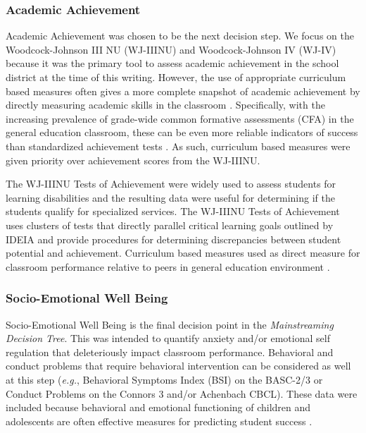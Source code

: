 \documentclass[twoside]{article}
\begin{document}
\subsubsection{Academic Achievement}
Academic Achievement was chosen to be the next decision step. We focus on the Woodcock-Johnson III NU (WJ-IIINU) and Woodcock-Johnson IV (WJ-IV) because it was the primary tool to assess academic achievement in the school district at the time of this writing. However, the use of appropriate curriculum based measures often gives a more complete snapshot of academic achievement by directly measuring academic skills in the classroom \parencite{mathes1998preparing}. Specifically, with the increasing prevalence of grade-wide common formative assessments (CFA) in the general education classroom, these can be even more reliable indicators of success than standardized achievement tests \parencite{dunn2009critical,heritage2007formative,mathes1998preparing}. As such, curriculum based measures were given priority over achievement scores from the WJ-IIINU.

The WJ-IIINU Tests of Achievement were widely used to assess students for learning disabilities and the resulting data were useful for determining if the students qualify for specialized services. The WJ-IIINU Tests of Achievement uses clusters of tests that directly parallel critical learning goals outlined by IDEIA and provide  procedures for determining discrepancies between student potential and achievement. Curriculum based measures used as direct measure for classroom performance relative to peers in general education environment \parencite{edwards2006factorial,taub2004confirmatory,wu2008short}.

\subsubsection{Socio-Emotional Well Being}
Socio-Emotional Well Being is the final decision point in the \textit{Mainstreaming Decision Tree}. This was intended to quantify anxiety and/or emotional self regulation that deleteriously impact classroom performance. Behavioral and conduct problems that require behavioral intervention can be considered as well at this step (\textit{e.g.}, Behavioral Symptoms Index (BSI) on the BASC-2/3 or Conduct Problems on the Connors 3 and/or Achenbach CBCL). These data were included because behavioral and emotional functioning of children and adolescents are often effective measures for predicting student success \parencite{wiesner2013exploratory}. 
\end{document}
